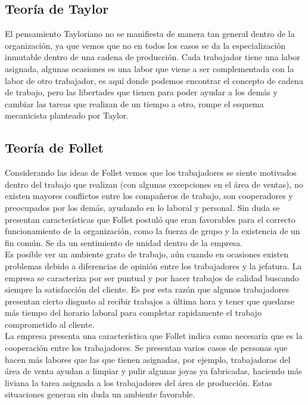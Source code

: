\subsection{Teoría de Taylor}
	El pensamiento Tayloriano no se manifiesta de manera tan general dentro de la organización, ya que vemos que no
	en todos los casos se da la especialización inmutable dentro de una cadena de producción. Cada trabajador tiene una labor
	asignada, algunas ocasiones es una labor que viene a ser complementada con la labor de otro trabajador, es aquí donde
	podemos encontrar el concepto de cadena de trabajo, pero las libertades que tienen para poder
	ayudar a los demás y cambiar las tareas que realizan de un tiempo a otro, rompe el esquema mecanicista
	planteado por Taylor. \\

\subsection{Teoría de Follet}
	Considerando las ideas de Follet vemos que los trabajadores se siente motivados dentro del
	trabajo que realizan (con algunas excepciones en el área de ventas), no existen mayores conflictos entre los
	 compañeros de trabajo, son cooperadores y preocupados por los demás, ayudando
	en lo laboral y personal. Sin duda se presentan características que Follet postuló que eran favorables para 
	el correcto funcionamiento de la organización, como la fuerza de grupo y la existencia de un fin
	común. Se da un sentimiento de unidad dentro de la empresa.\\
	
	Es posible ver un ambiente grato de trabajo, aún cuando en ocasiones existen problemas
	debido a diferencias de opinión entre los trabajadores y la jefatura. La empresa se
	caracteriza por ser puntual y por hacer trabajos de calidad buscando siempre la
	satisfacción del cliente. Es por esta razón que algunos trabajadores presentan cierto
	disgusto al recibir trabajos a última hora y tener que quedarse más tiempo del horario
	laboral para completar rapidamente el trabajo comprometido al cliente.\\

	La empresa presenta una característica que Follet indica como necesaria que es la
	cooperación entre los trabajadores. Se presentan varios casos de personas que hacen
	más labores que las que tienen asignadas, por ejemplo, trabajadoras del área de venta
	ayudan a limpiar y pulir algunas joyas ya fabricadas, haciendo más liviana la tarea
	asignada a los trabajadores del área de producción. Estas situaciones generan sin duda 
	un ambiente favorable.\\

